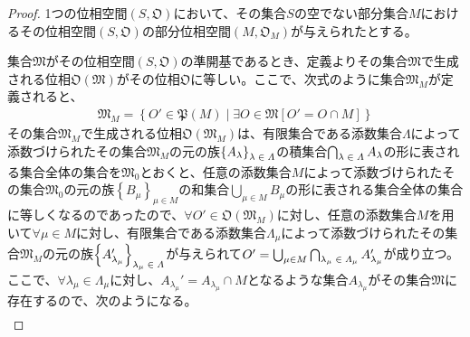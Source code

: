 \documentclass[dvipdfmx]{jsarticle}
\begin{document}
\begin{proof}
1つの位相空間$\left( S,\mathfrak{O} \right)$において、その集合$S$の空でない部分集合$M$におけるその位相空間$\left( S,\mathfrak{O} \right)$の部分位相空間$\left( M,\mathfrak{O}_{M} \right)$が与えられたとする。\par
集合$\mathfrak{M}$がその位相空間$\left( S,\mathfrak{O} \right)$の準開基であるとき、定義よりその集合$\mathfrak{M}$で生成される位相$\mathfrak{O}\left( \mathfrak{M} \right)$がその位相$\mathfrak{O}$に等しい。ここで、次式のように集合$\mathfrak{M}_{M}$が定義されると、
\begin{align*}
\mathfrak{M}_{M} = \left\{ O'\in \mathfrak{P}(M) \middle| \exists O \in \mathfrak{M}\left[ O' = O \cap M \right] \right\}
\end{align*}
その集合$\mathfrak{M}_{M}$で生成される位相$\mathfrak{O}\left( \mathfrak{M}_{M} \right)$は、有限集合である添数集合$\varLambda$によって添数づけられたその集合$\mathfrak{M}_{M}$の元の族$\left\{ A_{\lambda} \right\}_{\scriptsize \begin{matrix}
\lambda \in \varLambda \\
\end{matrix}}$の積集合$\bigcap_{\scriptsize \begin{matrix}
\lambda \in \varLambda \\
\end{matrix}} A_{\lambda}$の形に表される集合全体の集合を$\mathfrak{M}_{0}$とおくと、任意の添数集合$M$によって添数づけられたその集合$\mathfrak{M}_{0}$の元の族$\left\{ B_{\mu} \right\}_{\mu \in M}$の和集合$\bigcup_{\mu \in M} B_{\mu}$の形に表される集合全体の集合に等しくなるのであったので、$\forall O'\in \mathfrak{O}\left( \mathfrak{M}_{M} \right)$に対し、任意の添数集合$M$を用いて$\forall\mu \in M$に対し、有限集合である添数集合$\varLambda_{\mu}$によって添数づけられたその集合$\mathfrak{M}_{M}$の元の族$\left\{ A_{\lambda_{\mu}}' \right\}_{\scriptsize \begin{matrix}
\lambda_{\mu} \in \varLambda \\
\end{matrix}}$が与えられて$O' = \bigcup_{\mu \in M} {\bigcap_{\scriptsize \begin{matrix}
\lambda_{\mu} \in \varLambda_{\mu} \\
\end{matrix}} A_{\lambda_{\mu}}'}$が成り立つ。ここで、$\forall\lambda_{\mu} \in \varLambda_{\mu}$に対し、$A_{\lambda_{\mu}}' = A_{\lambda_{\mu}} \cap M$となるような集合$A_{\lambda_{\mu}}$がその集合$\mathfrak{M}$に存在するので、次のようになる。
\begin{align*}

\end{align*}
\end{proof}
\end{document}
